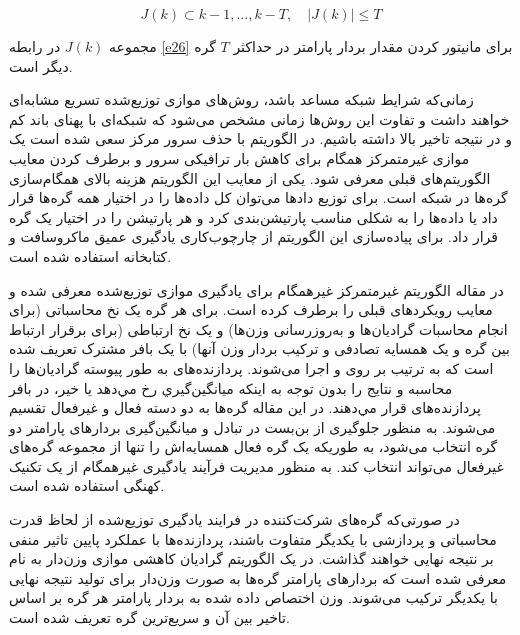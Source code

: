 \begin{equation}\label{e26}
	J(k)\subset {k-1,...,k-T}, \quad \lvert J(k)\rvert\le T
\end{equation}

مجموعه $J(k)$ در رابطه \ref{e26} برای مانیتور کردن مقدار بردار پارامتر  در حداکثر $T$ گره دیگر است. 

زمانی‌که شرایط شبکه مساعد باشد، روش‌های  موازی توزیع‌شده تسریع مشابه‌ای خواهند داشت و تفاوت این روش‌ها زمانی مشخص می‌شود که شبکه‌ای با پهنای باند کم و در نتیجه تاخیر بالا داشته باشیم. در الگوریتم  \cite{Lian20171} با حذف سرور مرکز سعی شده است یک  موازی غیرمتمرکز همگام برای کاهش بار ترافیکی سرور و برطرف کردن معایب الگوریتم‌های قبلی معرفی شود. یکی از معایب این الگوریتم هزینه بالای همگام‌سازی گره‌ها در شبکه است. برای توزیع دادها می‌توان کل داده‌ها را در اختیار همه گره‌ها قرار داد یا داده‌ها را به شکلی مناسب پارتیشن‌بندی کرد و هر پارتیشن را در اختیار یک گره قرار داد. برای پیاده‌سازی این الگوریتم از چارچوب‌کاری یادگیری عمیق ماکروسافت  و کتابخانه  استفاده شده است. 

در مقاله \cite{lian2018} الگوریتم غیرمتمرکز غیرهمگام   برای یادگیری موازی توزیع‌شده معرفی شده و معایب رویکردهای قبلی را برطرف کرده است. برای هر گره  یک نخ محاسباتی (برای انجام محاسبات گرادیان‌ها و به‌روزرسانی وزن‌ها) و یک نخ ارتباطی (برای برقرار ارتباط بین گره  و یک همسایه تصادفی و ترکیب بردار وزن‌ آنها) با یک بافر مشترک  تعریف شده است که به ترتیب بر روی  و  اجرا می‌شوند. پردازنده‌های  به طور پيوسته گراديان‌ها را محاسبه و نتايج را بدون توجه به اينكه ميانگين‌گيري رخ مي‌دهد يا خير، در بافر پردازنده‌های  قرار مي‌دهند. در این مقاله گره‌ها به دو دسته فعال و غیرفعال تقسیم می‌شوند. به منظور جلوگیری از بن‌بست در تبادل و میانگین‌گیری بردارهای پارامتر دو گره انتخاب‌ می‌شود، به طوریکه یک گره فعال همسایه‌اش را تنها از مجموعه گره‌های غیرفعال می‌تواند انتخاب کند. به منظور مدیریت فرآیند یادگیری غیرهمگام از یک تکنیک کهنگی استفاده شده است. 

در صورتی‌که گره‌های شرکت‌کننده در فرایند یادگیری توزیع‌شده از لحاظ قدرت محاسباتی و پردازشی با یکدیگر متفاوت باشند، پردازنده‌ها با عملکرد پایین تاثیر منفی بر نتیجه نهایی خواهند گذاشت. در \cite{WP2020} یک الگوریتم گرادیان کاهشی موازی وزن‌دار به نام  معرفی شده است که بردارهای پارامتر گره‌ها به صورت وزن‌دار برای تولید نتیجه نهایی با یکدیگر ترکیب می‌شوند. وزن اختصاص داده شده به بردار پارامتر هر گره بر اساس تاخیر بین آن و سریع‌ترین گره تعریف شده است.


